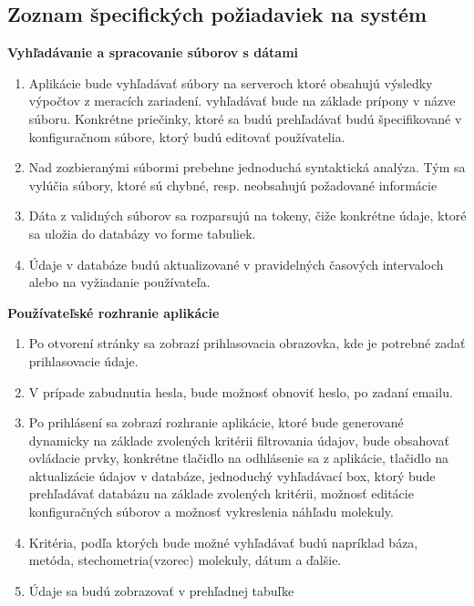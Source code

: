 \documentclass[12pt,a4paper]{article}
\begin{document}
\subsection{Zoznam špecifických požiadaviek na systém}
\begin{enumerate}[label={[\arabic*]}]
	\item { \bf Vyhľadávanie a spracovanie súborov s dátami } 
	\begin{enumerate}
		\item Aplikácie bude vyhľadávať súbory na serveroch ktoré obsahujú výsledky výpočtov z meracích zariadení. vyhľadávať bude na základe prípony v názve súboru. Konkrétne priečinky, ktoré sa budú prehľadávať budú špecifikované v konfiguračnom súbore, ktorý budú editovať používatelia.
		\item Nad zozbieranými súbormi prebehne jednoduchá syntaktická anal\-ýza. Tým sa vylúčia súbory, ktoré sú chybné, resp. neobsahujú požadované informácie
		\item Dáta z validných súborov sa rozparsujú na tokeny, čiže konkrétne údaje, ktoré sa uložia do databázy vo forme tabuliek.
		\item Údaje v databáze budú aktualizované v pravidelných časových intervaloch alebo na vyžiadanie používateľa.
	\end{enumerate}
	\item { \bf  Používateľské rozhranie aplikácie } 
	\begin{enumerate}
		\item Po otvorení stránky sa zobrazí prihlasovacia obrazovka, kde je potrebné zadať prihlasovacie údaje.
		\item V prípade zabudnutia hesla, bude možnosť obnoviť heslo, po za\-daní emailu.
		\item Po prihlásení sa zobrazí rozhranie aplikácie, ktoré bude generované dynamicky na základe zvolených kritérii filtrovania údajov, bude obsahovať ovládacie prvky, konkrétne tlačidlo na odhlásenie sa z aplikácie, tlačidlo na aktualizácie údajov v databáze, jednoduchý vyhľadávací box, ktorý bude prehľadávať databázu na základe zvolených kritérii, možnosť editácie konfiguračných súborov a mo\-žnosť vykreslenia náhľadu molekuly.
		\item Kritéria, podľa ktorých bude možné vyhľadávať budú napríklad báza, metóda, stechometria(vzorec) molekuly, dátum a ďalšie.
		\item Údaje sa budú zobrazovať v prehľadnej tabuľke
	\end{enumerate}
\end{enumerate}
\end{document}

